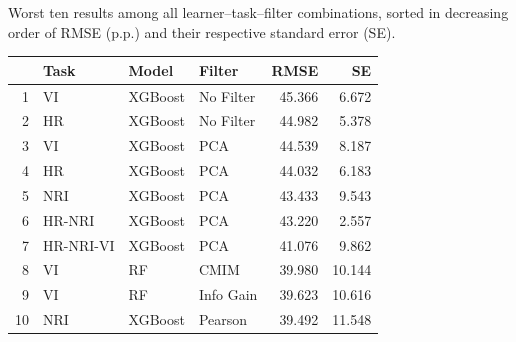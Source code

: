 \documentclass[remotesensing,article,accept,moreauthors,pdftex]{Definitions/mdpi}
\begin{document}
\begin{paracol}{2}
%
\begin{specialtable}[H]
\setlength{\tabcolsep}{5.7mm}
\caption{Worst ten results among all learner--task--filter combinations, sorted in decreasing order of RMSE (p.p.) and their respective standard error (SE).}
\label{tab:perf-worst-10}
\begin{tabular}{rlllrr}
\toprule
 & \textbf{Task} & \textbf{Model} & \textbf{Filter} & \textbf{RMSE} & \textbf{SE} \\
  \midrule
1 & VI & XGBoost & No Filter & 45.366 & 6.672 \\
  2 & HR & XGBoost & No Filter & 44.982 & 5.378 \\
  3 & VI & XGBoost & PCA & 44.539 & 8.187 \\
  4 & HR & XGBoost & PCA & 44.032 & 6.183 \\
  5 & NRI & XGBoost & PCA & 43.433 & 9.543 \\
  6 & HR-NRI & XGBoost & PCA & 43.220 & 2.557 \\
  7 & HR-NRI-VI & XGBoost & PCA & 41.076 & 9.862 \\
  8 & VI & RF & CMIM & 39.980 & 10.144 \\
  9 & VI & RF & Info Gain & 39.623 & 10.616 \\
  10 & NRI & XGBoost & Pearson & 39.492 & 11.548 \\
   \bottomrule
\end{tabular}
\end{specialtable}


\end{paracol}
\end{document}
